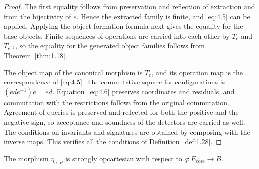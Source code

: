 \begin{proof}

The first equality follows from preservation and reflection of extraction and from the
bijectivity of $e$. Hence the extracted family is finite, and \eqref{eq:4.5} can be
applied. Applying the object-formation formula next gives the equality for the base
objects. Finite sequences of operations are carried into each other by $T_e$ and
$T_{e^{-1}}$, so the equality for the generated object families follows from
Theorem~\ref{thm:1.18}.

The object map of the canonical morphism is $T_e$, and its operation map is the
correspondence of \eqref{eq:4.5}.
The commutative square for configurations is $(ede^{-1})e=ed$.
Equation~\eqref{eq:4.6} preserves coordinates and residuals, and commutation with the
restrictions follows from the original commutation.
Agreement of queries is preserved and reflected for both the positive and the negative
sign, so acceptance and soundness of the detectors are carried as well.
The conditions on invariants and signatures are obtained by composing with the inverse
maps. This verifies all the conditions of Definition~\ref{def:1.28}.

\end{proof}

\begin{theorem}\label{thm:4.5}

The morphism $\eta_{\sigma,P}$ is strongly opcartesian with respect to
$q:E_{\mathrm{core}}\to B$.

\end{theorem}

